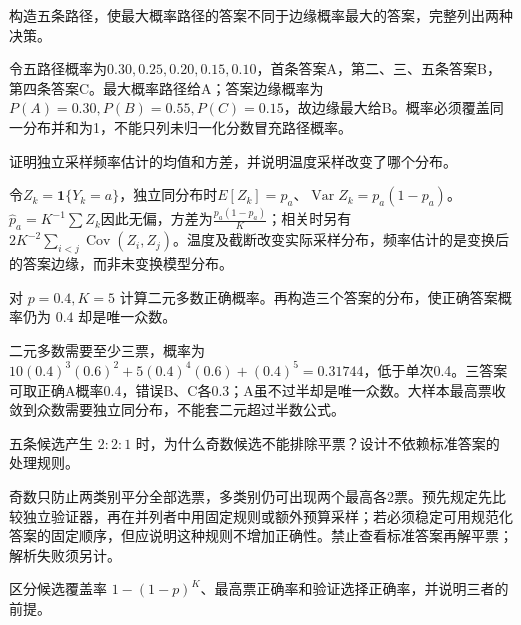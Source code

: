\begin{exercises}
\begin{exercise} 构造五条路径，使最大概率路径的答案不同于边缘概率最大的答案，完整列出两种决策。

\begin{solution}
令五路径概率为$0.30,0.25,0.20,0.15,0.10$，首条答案A，第二、三、五条答案B，第四条答案C。最大概率路径给A；答案边缘概率为$P(A)=0.30,P(B)=0.55,P(C)=0.15$，故边缘最大给B。概率必须覆盖同一分布并和为1，不能只列未归一化分数冒充路径概率。
\end{solution}
\end{exercise}

\begin{exercise} 证明独立采样频率估计的均值和方差，并说明温度采样改变了哪个分布。

\begin{solution}
令$Z_k=\mathbf1\{Y_k=a\}$，独立同分布时$E[Z_k]=p_a$、$\operatorname{Var}Z_k=p_a(1-p_a)$。$\hat p_a=K^{-1}\sum Z_k$因此无偏，方差为$\frac{p_a(1-p_a)}{K}$；相关时另有$2K^{-2}\sum_{i<j}\operatorname{Cov}(Z_i,Z_j)$。温度及截断改变实际采样分布，频率估计的是变换后的答案边缘，而非未变换模型分布。
\end{solution}
\end{exercise}

\begin{exercise} 对 $p=0.4,K=5$ 计算二元多数正确概率。再构造三个答案的分布，使正确答案概率仍为 $0.4$ 却是唯一众数。

\begin{solution}
二元多数需要至少三票，概率为 $10(0.4)^3(0.6)^2+5(0.4)^4(0.6)+(0.4)^5=0.31744$，低于单次0.4。三答案可取正确A概率0.4，错误B、C各0.3；A虽不过半却是唯一众数。大样本最高票收敛到众数需要独立同分布，不能套二元超过半数公式。
\end{solution}
\end{exercise}

\begin{exercise} 五条候选产生 $2:2:1$ 时，为什么奇数候选不能排除平票？设计不依赖标准答案的处理规则。

\begin{solution}
奇数只防止两类别平分全部选票，多类别仍可出现两个最高各2票。预先规定先比较独立验证器，再在并列者中用固定规则或额外预算采样；若必须稳定可用规范化答案的固定顺序，但应说明这种规则不增加正确性。禁止查看标准答案再解平票；解析失败须另计。
\end{solution}
\end{exercise}

\begin{exercise} 区分候选覆盖率 $1-(1-p)^K$、最高票正确率和验证选择正确率，并说明三者的前提。


\end{exercise}
\end{exercises}
